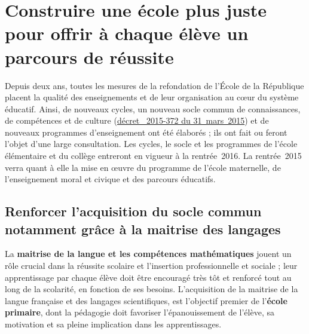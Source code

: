 \section{Construire une école plus juste pour offrir à chaque élève un parcours de réussite}
Depuis deux ans, toutes les mesures de la refondation de l’École de la République placent la qualité des enseignements et de leur organisation au cœur du système éducatif. Ainsi, de nouveaux cycles, un nouveau socle commun de connaissances, de compétences et de culture (\href{http://www.education.gouv.fr/pid25535/bulletin_officiel.html?cid_bo=87834}{décret \no{}~2015-372 du 31~mars~2015}) et de nouveaux programmes d’enseignement ont été élaborés ; ils ont fait ou feront l’objet d’une large consultation. Les cycles, le socle et les programmes de l’école élémentaire et du collège entreront en vigueur à la rentrée~2016. La rentrée~2015 verra quant à elle la mise en œuvre du programme de l’école maternelle, de l’enseignement moral et civique et des parcours éducatifs.

\subsection{Renforcer l’acquisition du socle commun notamment grâce à la maitrise des langages}
La \textbf{maitrise de la langue et les compétences mathématiques} jouent un rôle crucial dans la réussite scolaire et l’insertion professionnelle et sociale ; leur apprentissage par chaque élève doit être encouragé très tôt et renforcé tout au long de la scolarité, en fonction de ses besoins. L’acquisition de la maitrise de la langue française et des langages scientifiques, est l’objectif premier de l’\textbf{école primaire}, dont la pédagogie doit favoriser l’épanouissement de l’élève, sa motivation et sa pleine implication dans les apprentissages.

